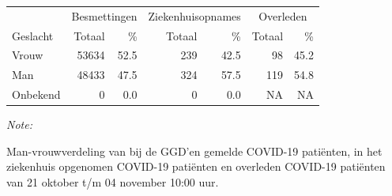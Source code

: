 \documentclass[
  english,
  man,floatsintext]{apa6}
\begin{document}
\begin{table}
\centering\begingroup\fontsize{11}{13}\selectfont

\begin{threeparttable}
\begin{tabular}{lrrrrrr}
\toprule
\multicolumn{1}{c}{ } & \multicolumn{2}{c}{Besmettingen} & \multicolumn{2}{c}{Ziekenhuisopnames} & \multicolumn{2}{c}{Overleden} \\
\cmidrule(l{3pt}r{3pt}){2-3} \cmidrule(l{3pt}r{3pt}){4-5} \cmidrule(l{3pt}r{3pt}){6-7}
Geslacht & Totaal & \% & Totaal & \% & Totaal & \%\\
\midrule
Vrouw & 53634 & 52.5 & 239 & 42.5 & 98 & 45.2\\
Man & 48433 & 47.5 & 324 & 57.5 & 119 & 54.8\\
Onbekend & 0 & 0.0 & 0 & 0.0 & NA & NA\\
\bottomrule
\end{tabular}
\begin{tablenotes}
\item \textit{Note: } 
\item Man-vrouwverdeling van bij de GGD’en gemelde COVID-19 patiënten, in het ziekenhuis opgenomen COVID-19 patiënten en overleden COVID-19 patiënten van 21 oktober t/m 04 november 10:00 uur.
\end{tablenotes}
\end{threeparttable}
\endgroup{}
\end{table}
\newpage
\end{document}
